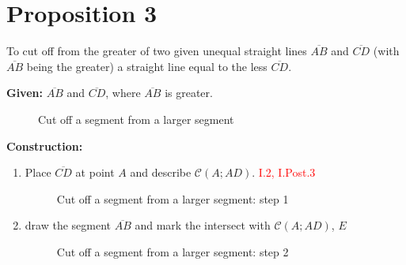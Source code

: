 \section*{Proposition 3}

\begin{con}
To cut off from the greater of two given unequal straight lines $\overline{AB}$ and $\overline{CD}$ (with $\overline{AB}$ being the greater) a straight line equal to the less $\overline{CD}$.
\end{con}

\textbf{Given:} $\overline{AB}$ and $\overline{CD}$, where $\overline{AB}$ is greater.

\begin{figure}[H]
\centering
       \caption{Cut off a segment from a larger segment}
\end{figure}

\textbf{Construction:}

\begin{enumerate}
\item Place $\overline{CD}$ at point $A$ and describe $\mathscr{C}(A;AD)$.  \hfill\textcolor{red}{ I.2, I.Post.3}

\begin{figure}[H]  
\centering
	\caption{Cut off a segment from a larger segment: step 1}
\end{figure}

\clearpage

\item draw the segment $\overline{AB}$ and mark the intersect with $\mathscr{C}(A;AD)$, $E$
  
\begin{figure}[H]  
\centering
	\caption{Cut off a segment from a larger segment: step 2}
\end{figure}  

\end{enumerate}

